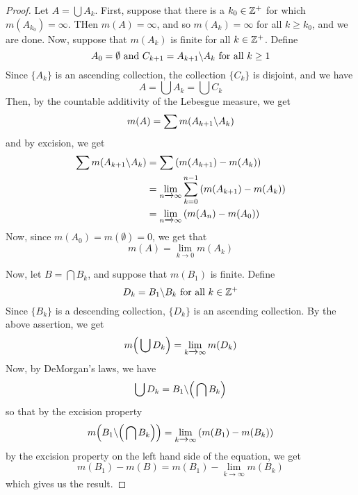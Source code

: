 \begin{proof}
    Let $A=\bigcup{A_k}$. First, suppose that there is a $k_0 \in \mathbb{Z}^+$ for
    which $m(A_{k_0})=\infty$. THen $m(A)=\infty$, and so $m(A_k)=\infty$ for
    all $k \geq k_0$, and we are done. Now, suppose that $m(A_k)$ is finite for
    all $k \in \mathbb{Z}^+$. Define
    \begin{equation*}
        A_0=\emptyset \text{ and } C_{k+1}=A_{k+1} \backslash A_k
        \text{ for all } k \geq 1
    \end{equation*}
    Since $\{A_k\}$ is an ascending collection, the collection $\{C_k\}$ is
    disjoint, and we have
    \begin{equation*}
        A=\bigcup{A_k}=\bigcup{C_k}
    \end{equation*}
    Then, by the countable additivity of the Lebesgue measure, we get
    \begin{equation*}
        m(A)=\sum{m(A_{k+1} \backslash A_k)}
    \end{equation*}
    and by excision, we get
    \begin{align*}
        \sum{m(A_{k+1} \backslash A_k)} &=  \sum{(m(A_{k+1})-m(A_k))}   \\
                                &= \lim_{n \xrightarrow{} \infty}
                                    \sum_{k=0}^{n-1}{(m(A_{k+1})-m(A_k))}   \\
                                &=  \lim_{n \xrightarrow{} \infty}{(m(A_n)-m(A_0))}
    \end{align*}
    Now, since $m(A_0)=m(\emptyset)=0$, we get that
    \begin{equation*}
        m(A)=\lim_{k \xrightarrow{} 0}{m(A_k)}
    \end{equation*}

    Now, let $B=\bigcap{B_k}$, and suppose that $m(B_1)$ is finite. Define
    \begin{equation*}
        D_k=B_1 \backslash B_k \text{ for all } k \in \mathbb{Z}^+
    \end{equation*}
    Since $\{B_k\}$ is a descending collection, $\{D_k\}$ is an ascending
    collection. By the above assertion, we get
    \begin{equation*}
        m\Big{(} \bigcup{D_k} \Big{)}=\lim_{k \xrightarrow{} \infty}{m(D_k)}
    \end{equation*}
    Now, by DeMorgan's laws, we have
    \begin{equation*}
        \bigcup{D_k}=B_1 \backslash \Big{(} \bigcap{B_k} \Big{)}
    \end{equation*}
    so that by the excision property
    \begin{equation*}
        m\Big{(} B_1 \backslash \Big{(} \bigcap{B_k} \Big{)} \Big{)}=
        \lim_{k \xrightarrow{} \infty}{(m(B_1)-m(B_k))}
    \end{equation*}
    by the excision property on the left hand side of the equation, we get
    \begin{equation*}
        m(B_1)-m(B)=m(B_1)-\lim_{k \xrightarrow{} \infty}{m(B_k)}
    \end{equation*}
    which gives us the result.
\end{proof}

